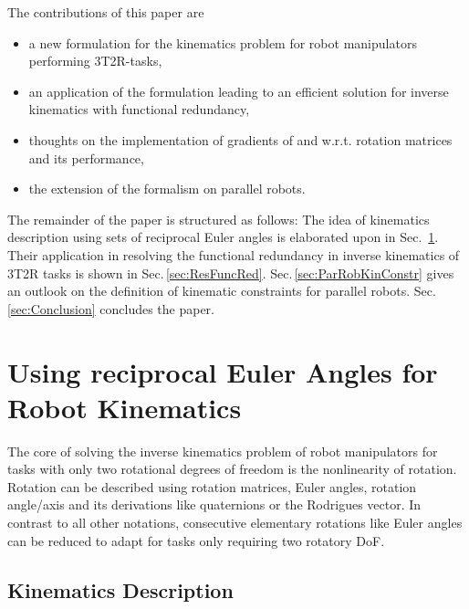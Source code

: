 \documentclass[twocolumn,10pt]{IFTOMM}
\begin{document}
The contributions of this paper are
\begin{itemize}
    \item a new formulation for the kinematics problem for robot manipulators performing 3T2R-tasks,
    \item an application of the formulation leading to an efficient solution for inverse kinematics with functional redundancy,
    \item thoughts on the implementation of gradients of and w.r.t. rotation matrices and its performance,
    \item the extension of the formalism on parallel robots.
\end{itemize}

The remainder of the paper is structured as follows: The idea of kinematics description using sets of reciprocal Euler angles is elaborated upon in Sec.\, \ref{sec:RecEulAng}.
Their application in resolving the functional redundancy in inverse kinematics of 3T2R tasks is shown in Sec.\,\ref{sec:ResFuncRed}.
Sec.\,\ref{sec:ParRobKinConstr} gives an outlook on the definition of kinematic constraints for parallel robots. 
Sec.\,\ref{sec:Conclusion} concludes the paper.

\section{Using reciprocal Euler Angles for Robot Kinematics}
\label{sec:RecEulAng}

The core of solving the inverse kinematics problem of robot manipulators for tasks with only two rotational degrees of freedom is the nonlinearity of rotation.
Rotation can be described using rotation matrices, Euler angles, rotation angle/axis and its derivations like quaternions or the Rodrigues vector.
In contrast to all other notations, consecutive elementary rotations like Euler angles can be reduced to adapt for tasks only requiring two rotatory DoF.

\subsection{Kinematics Description}
\label{sec:RecEulAng_KinDesc}
\end{document}
